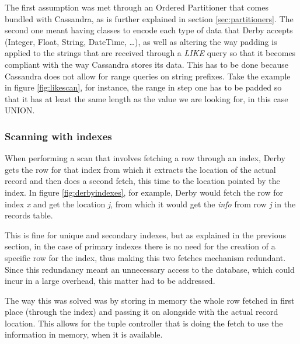 The first assumption was met through an Ordered Partitioner that comes bundled with Cassandra, as is further explained in section \ref{sec:partitioners}. The second one meant having classes to encode each type of data that Derby accepts (Integer, Float, String, DateTime, \ldots), as well as altering the way padding is applied to the strings that are received through a \emph{LIKE} query so that it becomes compliant with the way Cassandra stores its data. This has to be done because Cassandra does not allow for range queries on string prefixes. Take the example in figure \ref{fig:likescan}, for instance, the range in step one has to be padded so that it has at least the same length as the value we are looking for, in this case UNION. 

\subsubsection{Scanning with indexes}

When performing a scan that involves fetching a row through an index, Derby gets the row for that index from which it extracts the location of the actual record and then does a second fetch, this time to the location pointed by the index. In figure \ref{fig:derbyindexes}, for example, Derby would fetch the row for index \emph{x} and get the location \emph{j}, from which it would get the \emph{info} from row \emph{j} in the records table.

This is fine for unique and secondary indexes, but as explained in the previous section, in the case of primary indexes there is no need for the creation of a specific row for the index, thus making this two fetches mechanism redundant. Since this redundancy meant an unnecessary access to the database, which could incur in a large overhead, this matter had to be addressed. 

The way this was solved was by storing in memory the whole row fetched in first place (through the index) and passing it on alongside with the actual record location. This allows for the tuple controller that is doing the fetch to use the information in memory, when it is available.   








